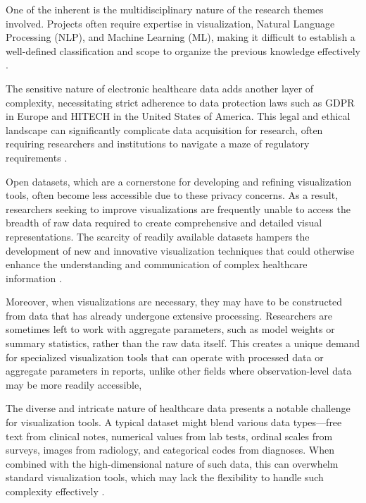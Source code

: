 One of the inherent is the multidisciplinary nature of the research themes involved. Projects often require expertise in visualization, Natural Language Processing (NLP), and Machine Learning (ML), making it difficult to establish a well-defined classification and scope to organize the previous knowledge effectively \cite{soa9}.

The sensitive nature of electronic healthcare data adds another layer of complexity, necessitating strict adherence to data protection laws such as GDPR \cite{soa11} in Europe and HITECH \cite{soa10} in the United States of America. This legal and ethical landscape can significantly complicate data acquisition for research, often requiring researchers and institutions to navigate a maze of regulatory requirements \cite{soa9}.

Open datasets, which are a cornerstone for developing and refining visualization tools, often become less accessible due to these privacy concerns. As a result, researchers seeking to improve visualizations are frequently unable to access the breadth of raw data required to create comprehensive and detailed visual representations. The scarcity of readily available datasets hampers the development of new and innovative visualization techniques that could otherwise enhance the understanding and communication of complex healthcare information \cite{soa9}.

Moreover, when visualizations are necessary, they may have to be constructed from data that has already undergone extensive processing. Researchers are sometimes left to work with aggregate parameters, such as model weights or summary statistics, rather than the raw data itself. This creates a unique demand for specialized visualization tools that can operate with processed data or aggregate parameters in reports, unlike other fields where observation-level data may be more readily accessible,

The diverse and intricate nature of healthcare data presents a notable challenge for visualization tools. A typical dataset might blend various data types—free text from clinical notes, numerical values from lab tests, ordinal scales from surveys, images from radiology, and categorical codes from diagnoses. When combined with the high-dimensional nature of such data, this can overwhelm standard visualization tools, which may lack the flexibility to handle such complexity effectively \cite{soa12}\cite{soa13}.

